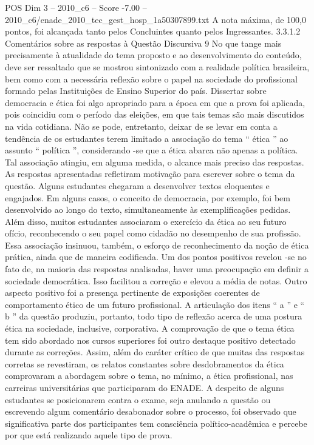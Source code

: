 \begin{textsample}{POS Dim 3 – 2010\_c6 – Score -7.00 – 2010\_c6/enade\_2010\_tec\_gest\_hosp\_1a50307899.txt}
A nota máxima, de 100,0 pontos, foi alcançada tanto pelos Concluintes quanto pelos Ingressantes. 3.3.1.2 Comentários sobre as respostas à Questão Discursiva 9 No que tange mais precisamente à atualidade do tema proposto e ao desenvolvimento do conteúdo, deve ser ressaltado que se mostrou sintonizado com a realidade política brasileira, bem como com a necessária reflexão sobre o papel na sociedade do profissional formado pelas Instituições de Ensino Superior do país.
Dissertar sobre democracia e ética foi algo apropriado para a época em que a prova foi aplicada, pois coincidiu com o período das eleições, em que tais temas são mais discutidos na vida cotidiana.
Não se pode, entretanto, deixar de se levar em conta a tendência de os estudantes terem limitado a associação do tema “ ética ” ao assunto “ política ”, considerando -se que a ética abarca não apenas a política.
Tal associação atingiu, em alguma medida, o alcance mais preciso das respostas.
As respostas apresentadas refletiram motivação para escrever sobre o tema da questão.
Alguns estudantes chegaram a desenvolver textos eloquentes e engajados.
Em alguns casos, o conceito de democracia, por exemplo, foi bem desenvolvido ao longo do texto, simultaneamente às exemplificações pedidas.
Além disso, muitos estudantes associaram o exercício da ética ao seu futuro ofício, reconhecendo o seu papel como cidadão no desempenho de sua profissão.
Essa associação insinuou, também, o esforço de reconhecimento da noção de ética prática, ainda que de maneira codificada.
Um dos pontos positivos revelou -se no fato de, na maioria das respostas analisadas, haver uma preocupação em definir a sociedade democrática.
Isso facilitou a correção e elevou a média de notas.
Outro aspecto positivo foi a presença pertinente de exposições coerentes de comportamento ético de um futuro profissional.
A articulação dos itens “ a ” e “ b ” da questão produziu, portanto, todo tipo de reflexão acerca de uma postura ética na sociedade, inclusive, corporativa.
A comprovação de que o tema ética tem sido abordado nos cursos superiores foi outro destaque positivo detectado durante as correções.
Assim, além do caráter crítico de que muitas das respostas corretas se revestiram, os relatos constantes sobre desdobramentos da ética comprovaram a abordagem sobre o tema, no mínimo, a ética profissional, nas carreiras universitárias que participaram do ENADE.
A despeito de alguns estudantes se posicionarem contra o exame, seja anulando a questão ou escrevendo algum comentário desabonador sobre o processo, foi observado que significativa parte dos participantes tem consciência político-acadêmica e percebe por que está realizando aquele tipo de prova.

\end{textsample}
